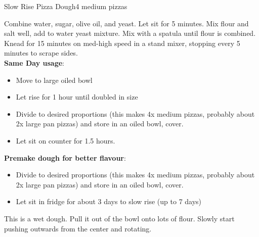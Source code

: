 \begin{recipe}{Slow Rise Pizza Dough}{4 medium pizzas}{}


    Combine water, sugar,  olive oil, and yeast. Let sit for 5 minutes. Mix flour and salt well, add to water yeast mixture. Mix with a spatula until flour is combined. Knead for 15 minutes on med-high speed in a stand mixer, stopping every 5 minutes to scrape sides.\\

    \textbf{Same Day usage}:
    \begin{itemize}
        \item Move to large oiled bowl
        \item Let rise for 1 hour until doubled in size
        \item Divide to desired proportions (this makes 4x medium pizzas, probably about 2x large pan pizzas) and store in an oiled bowl, cover.
        \item Let sit on counter for 1.5 hours.
    \end{itemize}
    \textbf{Premake dough for better flavour}:
    \begin{itemize}
        \item Divide to desired proportions (this makes 4x medium pizzas, probably about 2x large pan pizzas) and store in an oiled bowl, cover.
        \item Let sit in fridge for about 3 days to slow rise (up to 7 days)
    \end{itemize}

    This is a wet dough. Pull it out of the bowl onto lots of flour. Slowly start pushing outwards from the center and rotating.
\end{recipe}